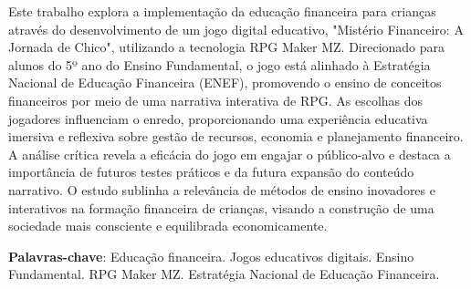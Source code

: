 
\setlength{\absparsep}{18pt} %
\begin{resumo}
	Este trabalho explora a implementação da educação financeira para crianças através do desenvolvimento de um jogo digital educativo, "Mistério Financeiro: A Jornada de Chico", utilizando a tecnologia RPG Maker MZ. Direcionado para alunos do 5º ano do Ensino Fundamental, o jogo está alinhado à Estratégia Nacional de Educação Financeira (ENEF), promovendo o ensino de conceitos financeiros por meio de uma narrativa interativa de RPG. As escolhas dos jogadores influenciam o enredo, proporcionando uma experiência educativa imersiva e reflexiva sobre gestão de recursos, economia e planejamento financeiro. A análise crítica revela a eficácia do jogo em engajar o público-alvo e destaca a importância de futuros testes práticos e da futura expansão do conteúdo narrativo. O estudo sublinha a relevância de métodos de ensino inovadores e interativos na formação financeira de crianças, visando a construção de uma sociedade mais consciente e equilibrada economicamente.

	\textbf{Palavras-chave}: Educação financeira. Jogos educativos digitais. Ensino Fundamental. RPG Maker MZ. Estratégia Nacional de Educação Financeira.

\end{resumo}